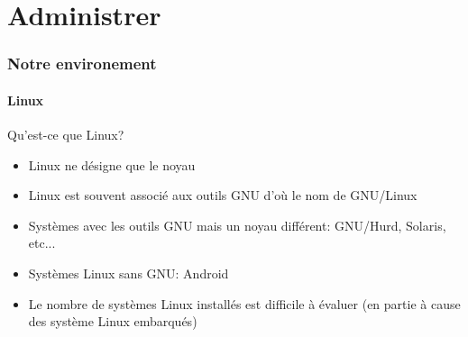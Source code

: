 %
%

\part{Administrer}

\begin{frame}
  \partpage
\end{frame}

\begin{frame}
  \tableofcontents
\end{frame}

\section{Notre environement}

\subsection{Linux}

\begin{frame}{Qu'est-ce que Linux?}
  \begin{itemize}
  \item  Linux ne désigne  que le  noyau
  \item  Linux est  souvent  associé aux  outils  GNU d'où  le nom  de
    GNU/Linux
  \item  Systèmes  avec  les  outils  GNU  mais  un  noyau  différent:
    GNU/Hurd, Solaris, etc...
  \item Systèmes Linux sans GNU: Android
  \item Le nombre de systèmes  Linux installés est difficile à évaluer
    (en partie à cause des système Linux embarqués)
  \end{itemize}
\end{frame}

